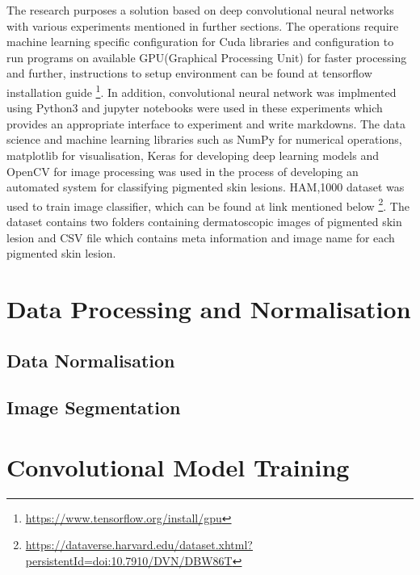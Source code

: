 The research purposes a solution based on deep convolutional neural networks with various experiments mentioned in further sections.
The operations require machine learning specific configuration for Cuda libraries and configuration to run programs on available GPU(Graphical Processing Unit) for faster processing and further, 
instructions to setup environment can be found at tensorflow installation guide \footnote[1]{\url{https://www.tensorflow.org/install/gpu}}. 
In addition, convolutional neural network was implmented using Python3 and jupyter notebooks 
were used in these experiments which provides an appropriate interface to 
experiment and write markdowns. The data science and machine learning libraries 
such as NumPy for numerical operations, matplotlib for visualisation, Keras for developing deep learning models and OpenCV for image processing was used in the process of developing an automated system for classifying pigmented skin lesions.
HAM,1000 dataset was used to train image classifier, which can be found at link mentioned below \footnote[2]{\url{https://dataverse.harvard.edu/dataset.xhtml?persistentId=doi:10.7910/DVN/DBW86T}}.
The dataset contains two folders containing dermatoscopic images of pigmented skin lesion and CSV file which contains meta information and image name for each pigmented skin lesion.

\section{Data Processing and Normalisation}

\subsection{Data Normalisation}

\subsection{ Image Segmentation }


\pagebreak
\section{Convolutional Model Training}

